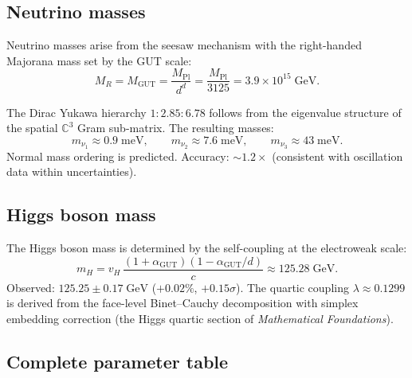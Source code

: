 \documentclass[12pt]{article}
\theoremstyle{remark}
\theoremstyle{definition}
\newcommand{\CC}{\mathbb{C}}
\begin{document}
\subsection{Neutrino masses}

Neutrino masses arise from the seesaw mechanism with the right-handed Majorana mass set by the GUT scale:
\begin{equation}
M_R = M_\text{GUT} = \frac{M_\text{Pl}}{d^d} = \frac{M_\text{Pl}}{3125} = 3.9 \times 10^{15}\;\text{GeV}.
\end{equation}

The Dirac Yukawa hierarchy $1 : 2.85 : 6.78$ follows from the eigenvalue structure of the spatial $\CC^3$ Gram sub-matrix. The resulting masses:
\begin{equation}
m_{\nu_1} \approx 0.9\;\text{meV}, \qquad m_{\nu_2} \approx 7.6\;\text{meV}, \qquad m_{\nu_3} \approx 43\;\text{meV}.
\end{equation}
Normal mass ordering is predicted. Accuracy: $\sim 1.2\times$ (consistent with oscillation data within uncertainties).

\subsection{Higgs boson mass}

The Higgs boson mass is determined by the self-coupling at the electroweak scale:
\begin{equation}
m_H = v_H\,\frac{(1+\alpha_\text{GUT})(1-\alpha_\text{GUT}/d)}{c} \approx 125.28\;\text{GeV}.
\end{equation}
Observed: $125.25 \pm 0.17\;\text{GeV}$ ($+0.02\%$, $+0.15\sigma$).  The quartic coupling $\lambda \approx 0.1299$ is derived from the face-level Binet--Cauchy decomposition with simplex embedding correction (the Higgs quartic section of \textit{Mathematical Foundations}).

\subsection{Complete parameter table}
\end{document}
